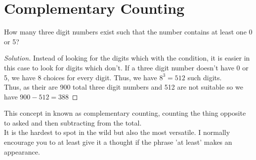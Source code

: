 \section{Complementary Counting}
\begin{example}
     How many three digit numbers exist such that the number contains at least one 0 or 5?
\end{example}
\begin{proof}
    [Solution]
    Instead of looking for the digits which with the condition, it is easier in this case to look for digits which don't. If a three digit number doesn't have 0 or 5, we have 8 choices for every digit. Thus, we have $8^3=512$ such digits.\\
    Thus, as their are 900 total three digit numbers and 512 are not suitable so we have $900-512=388$
\end{proof}
This concept in known as complementary counting, counting the thing opposite to asked and then subtracting from the total. \\
It is the hardest to spot in the wild but also the most versatile. I normally encourage you to at least give it a thought if the phrase 'at least' makes an appearance.
